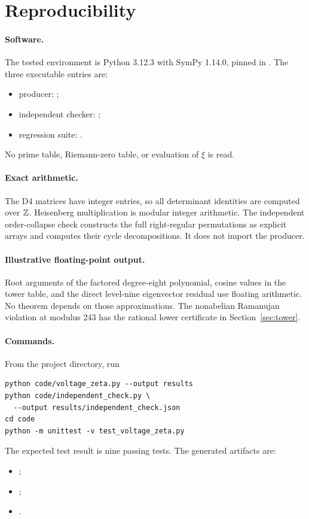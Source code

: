 \section{Reproducibility}
\label{app:reproducibility}

\paragraph{Software.}
The tested environment is Python 3.12.3 with SymPy 1.14.0, pinned in
. The three executable entries are:
\begin{itemize}[nosep]
\item producer: ;
\item independent checker: ;
\item regression suite: .
\end{itemize}
No prime table, Riemann-zero table, or evaluation of \(\xi\) is read.

\paragraph{Exact arithmetic.}
The D4 matrices have integer entries, so all determinant identities are
computed over \(\mathbb{Z}\). Heisenberg multiplication is modular integer
arithmetic. The independent order-collapse check constructs the full
right-regular permutations as explicit arrays and computes their cycle
decompositions. It does not import the producer.

\paragraph{Illustrative floating-point output.}
Root arguments of the factored degree-eight polynomial, cosine values in the
tower table, and the direct level-nine eigenvector residual use floating
arithmetic. No theorem depends on those approximations. The nonabelian
Ramanujan violation at modulus 243 has the rational lower certificate in
Section~\ref{sec:tower}.

\paragraph{Commands.}
From the project directory, run
\begin{verbatim}
python code/voltage_zeta.py --output results
python code/independent_check.py \
  --output results/independent_check.json
cd code
python -m unittest -v test_voltage_zeta.py
\end{verbatim}
The expected test result is nine passing tests. The generated artifacts are:
\begin{itemize}[nosep]
\item {};
\item {};
\item {}.
\end{itemize}

